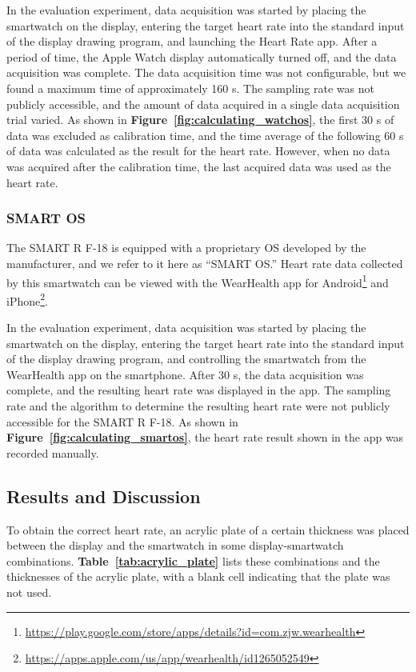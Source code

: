 \documentclass{ieeeaccess}
\newcommand\figref[1]{\textbf{Figure~\ref{fig:#1}}}
\newcommand\tabref[1]{\textbf{Table~\ref{tab:#1}}}
\begin{document}
In the evaluation experiment, data acquisition was started by placing the smartwatch on the display, entering the target heart rate into the standard input of the display drawing program, and launching the Heart Rate app. After a period of time, the Apple Watch display automatically turned off, and the data acquisition was complete. The data acquisition time was not configurable, but we found a maximum time of approximately 160 s. The sampling rate was not publicly accessible, and the amount of data acquired in a single data acquisition trial varied. As shown in \figref{calculating_watchos}, the first 30 s of data was excluded as calibration time, and the time average of the following 60 s of data was calculated as the result for the heart rate. However, when no data was acquired after the calibration time, the last acquired data was used as the heart rate.

\subsubsection{SMART OS}
The SMART R F-18 is equipped with a proprietary OS developed by the manufacturer, and we refer to it here as ``SMART OS.'' Heart rate data collected by this smartwatch can be viewed with the WearHealth app for Android\footnote{\url{https://play.google.com/store/apps/details?id=com.zjw.wearhealth}} and iPhone\footnote{\url{https://apps.apple.com/us/app/wearhealth/id1265052549}}.\par

In the evaluation experiment, data acquisition was started by placing the smartwatch on the display, entering the target heart rate into the standard input of the display drawing program, and controlling the smartwatch from the WearHealth app on the smartphone. After 30 s, the data acquisition was complete, and the resulting heart rate was displayed in the app. The sampling rate and the algorithm to determine the resulting heart rate were not publicly accessible for the SMART R F-18. As shown in \figref{calculating_smartos}, the heart rate result shown in the app was recorded manually.


\subsection{Results and Discussion}
To obtain the correct heart rate, an acrylic plate of a certain thickness was placed between the display and the smartwatch in some display-smartwatch combinations. \tabref{acrylic_plate} lists these combinations and the thicknesses of the acrylic plate, with a blank cell indicating that the plate was not used.\par
\end{document}
